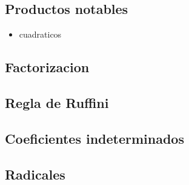 
\subsection{Productos notables}\label{producto-notable}

\begin{itemize}
\item cuadraticos
\end{itemize}

\subsection{Factorizacion}\label{Factorización}
\subsection{Regla de Ruffini}
\subsection{Coeficientes indeterminados}
\subsection{Radicales}

